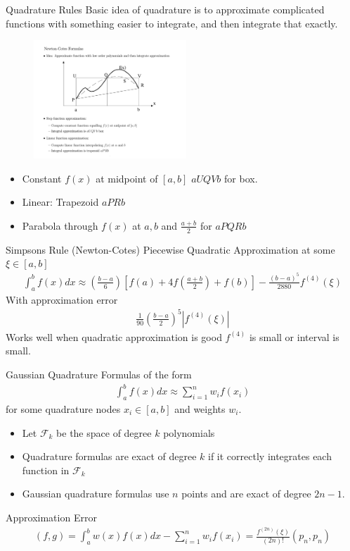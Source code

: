 \documentclass[xcolor=pdftex,dvipsnames,table,mathserif]{beamer}
\begin{document}
\begin{frame}{Quadrature Rules}
Basic idea of quadrature is to approximate complicated functions with something easier to integrate, and then integrate that exactly.\\
\begin{figure}[htbp]
\begin{center}
\includegraphics[height=1.75in]{quadrature.pdf}
\end{center}
\end{figure}
\begin{itemize}
\item Constant $f(x)$ at midpoint of $[a,b]$ $aUQVb$ for box.
\item Linear: Trapezoid $a PRb$
\item Parabola through $f(x)$ at $a,b$ and $\frac{a+b}{2}$ for $aPQRb$
\end{itemize}
\end{frame}

\begin{frame}{Simpsons Rule (Newton-Cotes)}
Piecewise Quadratic Approximation at some $\xi \in[a,b]$
\begin{eqnarray*}
\int_{a}^b f(x) d x \approx \left(\frac{b-a}{6} \right) \left[f(a) + 4f \left( \frac{a+b}{2} \right) + f(b) \right]  - \frac{(b-a)^5}{2880} f^{(4)} (\xi)
\end{eqnarray*}
With approximation error
\begin{eqnarray*}
\frac{1}{90} \left( \frac{b-a}{2}\right)^5 | f^{(4)} (\xi) |
\end{eqnarray*}
Works well when quadratic approximation is good $f^{(4)}$ is small or interval is small.
\end{frame}

\begin{frame}{Gaussian Quadrature}
Formulas of the form
\begin{eqnarray*}
\int_{a}^b f(x) d x \approx \sum_{i=1}^n  w_i f(x_i)
\end{eqnarray*}
for some quadrature nodes $x_i \in [a,b]$ and weights $w_i$.
\begin{itemize}
\item Let $\mathcal{F}_k$ be the space of degree $k$ polynomials
\item Quadrature formulas are exact of degree $k$ if it correctly integrates each function in $\mathcal{F}_k$
\item Gaussian quadrature formulas use $n$ points and are exact of degree $2n-1$.
\end{itemize}
Approximation Error
\begin{eqnarray*}
(f,g) = \int_a^b w(x) f(x)  dx - \sum_{i=1}^n w_i f(x_i) = \frac{f^{(2n)}(\xi)}{(2n)!} (p_n,p_n) 
\end{eqnarray*}
\end{frame}
\end{document}
